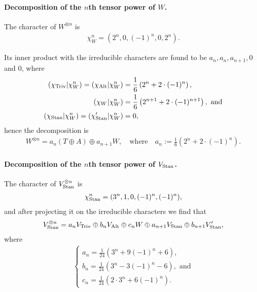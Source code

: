 {\begin{example}
	\paragraph{Decomposition of the $n$th tensor power of $W$.}	The character of $W^{\otimes n}$ is
	\begin{align*}
		\chi_{W}^n = (2^n, 0, (-1)^n, 0, 2^n).
	\end{align*}
	
	Its inner product with the irreducible characters are found to be $a_n, a_n, a_{n+1}, 0$ and $0$, where 
	\begin{align*}
		(\chi_{\text{Triv}}| \chi_{W}^n) = (\chi_{\text{Alt}} | \chi_{W}^n) &= \frac{1}{6} \left(2^n + 2 \cdot (-1)^n\right), \\
		(\chi_W | \chi_{W}^n) &= \frac{1}{6}\left(2^{n+1} + 2 \cdot (-1)^{n+1}\right), \text{ and}\\
		(\chi_{\text{Stan}} | \chi_{W}^n) = (\chi'_{\text{Stan}} | \chi_{W}^n) &= 0,
	\end{align*}
	hence the decomposition is
	\begin{align*}
		W^{\otimes n} = a_n (T \oplus A) \oplus a_{n+1} W, \quad \text{where} \quad a_n := \frac{1}{6}\left( 2^n + 2 \cdot (-1)^n \right).
	\end{align*}
	
	\paragraph{Decomposition of the $n$th tensor power of $V_{\text{Stan}}$.} The character of $V_{\text{Stan}}^{\otimes n}$ is 
	\begin{align*}
		\chi_{\text{Stan}}^n = (3^n, 1, 0, (-1)^n, (-1)^n),
	\end{align*}
	and after projecting it on the irreducible characters we find that
	\begin{align}\label{eq:nthpowerS}
		V_{\text{Stan}}^{\otimes n} = a_n V_{\text{Triv}} \oplus b_n V_{\text{Alt}} \oplus c_n W \oplus a_{n+1} V_{\text{Stan}} \oplus b_{n+1} V'_{\text{Stan}},
	\end{align}
	where 
	\begin{align*}
		\begin{cases}
			a_n = \frac{1}{24}(3^n + 9(-1)^n+6), \\
			b_n = \frac{1}{24}(3^n - 3(-1)^n -6), \text{ and} \\
			c_n = \frac{1}{24}(2\cdot 3^n + 6(-1)^n).
		\end{cases}
	\end{align*}
	

\end{example}}
